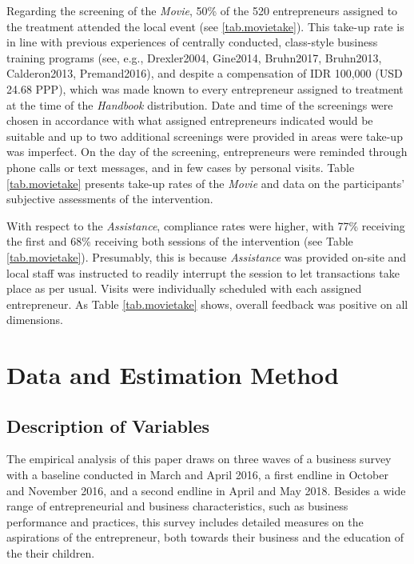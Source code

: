 \documentclass[11.5pt]{article}
\begin{document}
Regarding the screening of the \emph{Movie}, 50\% of the 520 entrepreneurs assigned to the treatment attended the local event (see \ref{tab.movietake}). This take-up rate is in line with previous experiences of centrally conducted, class-style business training programs (see, e.g., Drexler2004, Gine2014, Bruhn2017, Bruhn2013, Calderon2013, Premand2016), and despite a compensation of IDR 100,000 (USD 24.68 PPP), which was made known to every entrepreneur assigned to treatment at the time of the \emph{Handbook} distribution. Date and time of the screenings were chosen in accordance with what assigned entrepreneurs indicated would be suitable and up to two additional screenings were provided in areas were take-up was imperfect. On the day of the screening, entrepreneurs were reminded through phone calls or text messages, and in few cases by personal visits. Table \ref{tab.movietake} presents take-up rates of the \emph{Movie} and data on the participants' subjective assessments of the intervention.%

With respect to the \emph{Assistance}, compliance rates were higher, with 77\% receiving the first and 68\% receiving both sessions of the intervention (see Table \ref{tab.movietake}). Presumably, this is because \emph{Assistance} was provided on-site and local staff was instructed to readily interrupt the session to let transactions take place as per usual. Visits were individually scheduled with each assigned entrepreneur. As Table \ref{tab.movietake} shows, overall feedback was positive on all dimensions.

\section{Data and Estimation Method}\label{sec.data}

\subsection{Description of Variables}

The empirical analysis of this paper draws on three waves of a business survey with a baseline conducted in March and April 2016, a first endline in October and November 2016, and a second endline in April and May 2018. Besides a wide range of entrepreneurial and business characteristics, such as business performance and practices, this survey includes detailed measures on the aspirations of the entrepreneur, both towards their business and the education of the their children. \\ %
\end{document}
